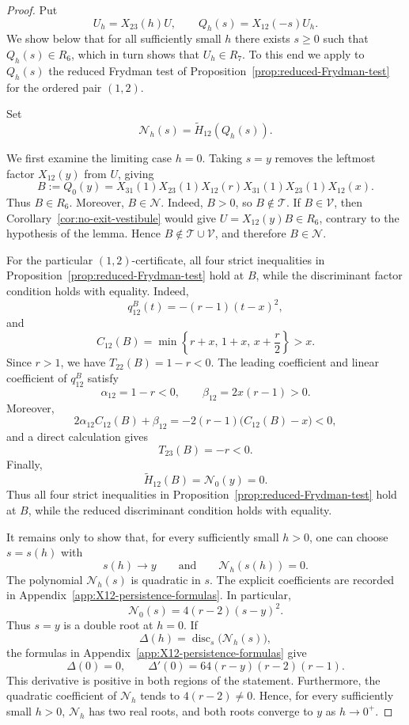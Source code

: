 \documentclass[11pt,onecolumn]{amsart}
\theoremstyle{plain}
\theoremstyle{definition}
\theoremstyle{remark}
\newcommand{\T}{\mathcal T}
\newcommand{\V}{\mathcal V}
\newcommand{\NH}{\mathcal N}
\newcommand{\disc}{\operatorname{disc}}
\begin{document}
\begin{proof}
	Put
	\[
	U_h=X_{23}(h)U,
	\qquad
	Q_h(s)=X_{12}(-s)U_h.
	\]
	We show below that for all sufficiently small $h$ there exists $s\geq 0$ such that $Q_h(s)\in R_6$, which in turn shows that $U_h\in R_7$.
	To this end we apply to $Q_h(s)$ the reduced Frydman test of
	Proposition~\ref{prop:reduced-Frydman-test} for the ordered pair
	$(1,2)$.
	
	Set
	\[
	\mathcal N_h(s)=\widetilde H_{12}(Q_h(s)).
	\]
	
	
	We first examine the limiting case $h=0$.  Taking $s=y$ removes the
	leftmost factor $X_{12}(y)$ from $U$, giving
	\[
	B:=Q_0(y)
	=
	X_{31}(1)X_{23}(1)X_{12}(r)
	X_{31}(1)X_{23}(1)X_{12}(x).
	\]
	Thus $B\in R_6$.  Moreover, $B\in\NH$. Indeed, $B>0$, so $B\notin\T$. If
	$B\in\V$, then Corollary~\ref{cor:no-exit-vestibule} would give
	$U=X_{12}(y)B\in R_6$, 	contrary to the hypothesis of the lemma. Hence $B\notin\T\cup\V$,
	and therefore $B\in\NH$.
	
	For the particular $(1,2)$-certificate, all four strict inequalities
	in Proposition~\ref{prop:reduced-Frydman-test} hold at $B$, while the
	discriminant factor condition holds with equality.  Indeed,
	\[
	q_{12}^B(t)=-(r-1)(t-x)^2,
	\]
	and
	\[
	C_{12}(B)
	=
	\min\left\{
	r+x,\,1+x,\,x+\frac r2
	\right\}>x.
	\]
	Since $r>1$, we have $T_{22}(B)=1-r<0$. The leading coefficient and linear coefficient of
	$q_{12}^B$ satisfy
	\[
	\alpha_{12}=1-r<0,
	\qquad
	\beta_{12}=2x(r-1)>0.
	\]
	Moreover,
	\[
	2\alpha_{12}C_{12}(B)+\beta_{12}
	=
	-2(r-1)\bigl(C_{12}(B)-x\bigr)<0,
	\]
	and a direct calculation gives
	\[
	T_{23}(B)=-r<0.
	\]
	Finally,
	\[
	\widetilde H_{12}(B)=\mathcal N_0(y)=0.
	\]
	Thus all four strict inequalities in
	Proposition~\ref{prop:reduced-Frydman-test} hold at $B$, while the
	reduced discriminant condition holds with equality.
	
	It remains only to show that, for every sufficiently small $h>0$, one
	can choose $s=s(h)$ with
	\[
	s(h)\to y
	\qquad\text{and}\qquad
	\mathcal N_h(s(h))=0.
	\]
	The polynomial $\mathcal N_h(s)$ is quadratic in $s$.  The explicit
	coefficients are recorded in Appendix~\ref{app:X12-persistence-formulas}.
	In particular,
	\[
	\mathcal N_0(s)=4(r-2)(s-y)^2.
	\]
	Thus $s=y$ is a double root at $h=0$.  If
	\[
	\Delta(h)=\disc_s\bigl(\mathcal N_h(s)\bigr),
	\]
	the formulas in Appendix~\ref{app:X12-persistence-formulas} give
	\[
	\Delta(0)=0,
	\qquad
	\Delta'(0)=64(r-y)(r-2)(r-1).
	\]
	This derivative is positive in both regions of the statement.
	Furthermore, the quadratic coefficient of $\mathcal N_h$ tends to
	$4(r-2)\neq0$.  Hence, for every sufficiently small $h>0$,
	$\mathcal N_h$ has two real roots, and both roots converge to $y$ as
	$h\to0^+$.
	

\end{proof}
\end{document}
